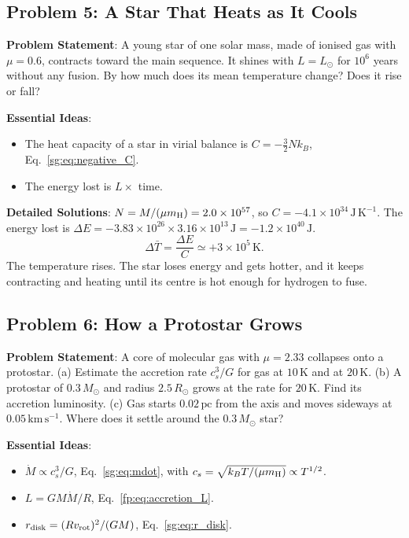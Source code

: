 \subsection{Problem 5: A Star That Heats as It Cools}
\label{sg:prob:negheat}

\textbf{Problem Statement}: A young star of one solar mass, made of ionised gas with $\mu=0.6$, contracts toward the main sequence. It shines with $L=L_\odot$ for $10^6$ years without any fusion. By how much does its mean temperature change? Does it rise or fall?

\textbf{Essential Ideas}:
\begin{itemize}
	\item The heat capacity of a star in virial balance is $C=-\tfrac32Nk_B$, Eq.~\eqref{sg:eq:negative_C}.
	\item The energy lost is $L\times$ time.
\end{itemize}

\textbf{Detailed Solutions}:
$N=M/(\mu m_{\rm H})=2.0\times10^{57}$, so $C=-4.1\times10^{34}\,\mathrm{J\,K^{-1}}$. The energy lost is $\Delta E=-3.83\times10^{26}\times3.16\times10^{13}\,\mathrm J=-1.2\times10^{40}\,\mathrm J$.
\[
\boxed{\Delta\bar T=\frac{\Delta E}{C}\simeq+3\times10^5\,\mathrm K.}
\]
The temperature rises. The star loses energy and gets hotter, and it keeps contracting and heating until its centre is hot enough for hydrogen to fuse.

\subsection{Problem 6: How a Protostar Grows}
\label{sg:prob:protostar}

\textbf{Problem Statement}: A core of molecular gas with $\mu=2.33$ collapses onto a protostar. (a) Estimate the accretion rate $c_s^3/G$ for gas at $10\,\mathrm K$ and at $20\,\mathrm K$. (b) A protostar of $0.3\,M_\odot$ and radius $2.5\,R_\odot$ grows at the rate for $20\,\mathrm K$. Find its accretion luminosity. (c) Gas starts $0.02\,\mathrm{pc}$ from the axis and moves sideways at $0.05\,\mathrm{km\,s^{-1}}$. Where does it settle around the $0.3\,M_\odot$ star?

\textbf{Essential Ideas}:
\begin{itemize}
	\item $\dot M\propto c_s^3/G$, Eq.~\eqref{sg:eq:mdot}, with $c_s=\sqrt{k_BT/(\mu m_{\rm H})}\propto T^{1/2}$.
	\item $L=GM\dot M/R$, Eq.~\eqref{fp:eq:accretion_L}.
	\item $r_{\rm disk}=(Rv_{\rm rot})^2/(GM)$, Eq.~\eqref{sg:eq:r_disk}.
\end{itemize}

